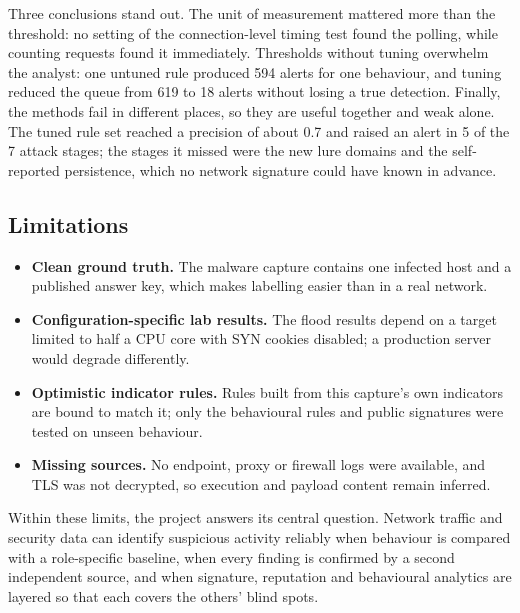 Three conclusions stand out. The unit of measurement mattered more than the threshold: no setting of the connection-level timing test found the polling, while counting requests found it immediately. Thresholds without tuning overwhelm the analyst: one untuned rule produced 594 alerts for one behaviour, and tuning reduced the queue from 619 to 18 alerts without losing a true detection. Finally, the methods fail in different places, so they are useful together and weak alone. The tuned rule set reached a precision of about 0.7 and raised an alert in 5 of the 7 attack stages; the stages it missed were the new lure domains and the self-reported persistence, which no network signature could have known in advance.

\subsection{Limitations}

\begin{itemize}
  \item \textbf{Clean ground truth.} The malware capture contains one infected host and a published answer key, which makes labelling easier than in a real network.
  \item \textbf{Configuration-specific lab results.} The flood results depend on a target limited to half a CPU core with SYN cookies disabled; a production server would degrade differently.
  \item \textbf{Optimistic indicator rules.} Rules built from this capture's own indicators are bound to match it; only the behavioural rules and public signatures were tested on unseen behaviour.
  \item \textbf{Missing sources.} No endpoint, proxy or firewall logs were available, and TLS was not decrypted, so execution and payload content remain inferred.
\end{itemize}

Within these limits, the project answers its central question. Network traffic and security data can identify suspicious activity reliably when behaviour is compared with a role-specific baseline, when every finding is confirmed by a second independent source, and when signature, reputation and behavioural analytics are layered so that each covers the others' blind spots.
